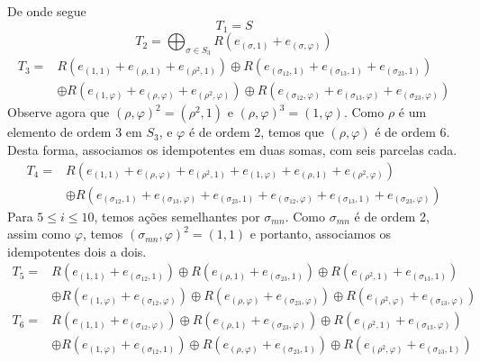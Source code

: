 \begin{exemplo}
De onde segue
\[T_1 = S\]
\[T_2 = \bigoplus_{\sigma \in S_3} R \left(e_{(\sigma, 1)} + e_{(\sigma,\varphi)}\right)\]
\begin{align*}
    T_3 =& R\left(e_{(1,1)} + e_{(\rho, 1)} + e_{(\rho^2, 1)} \right) \oplus R \left( e_{(\sigma_{12},1)} + e_{(\sigma_{13},1)} + e_{(\sigma_{23},1)} \right) \\
    &\oplus R\left(e_{(1,\varphi)} + e_{(\rho, \varphi)} + e_{(\rho^2, \varphi)} \right) \oplus R \left( e_{(\sigma_{12},\varphi)} + e_{(\sigma_{13},\varphi)} + e_{(\sigma_{23},\varphi)} \right)
\end{align*}
Observe agora que $(\rho, \varphi)^2 = (\rho^2, 1)$ e $(\rho, \varphi)^3 = (1, \varphi)$. Como $\rho$ é um elemento de ordem 3 em $S_3$, e $\varphi$ é de ordem 2, temos que $(\rho,\varphi)$ é de ordem 6. Desta forma, associamos os idempotentes em duas somas, com seis parcelas cada.
\begin{align*}
    T_4 = &R\left(e_{(1,1)} + e_{(\rho, \varphi)} + e_{(\rho^2, 1)} + e_{(1,\varphi)} + e_{(\rho, 1)} + e_{(\rho^2, \varphi)}\right) \\ 
    &\oplus R \left( e_{(\sigma_{12},1)} + e_{(\sigma_{13},\varphi)} + e_{(\sigma_{23},1)} + e_{(\sigma_{12},\varphi)} + e_{(\sigma_{13},1)} + e_{(\sigma_{23},\varphi)} \right)
\end{align*}
Para $5\leq i \leq 10$, temos ações semelhantes por $\sigma_{mn}$. Como $\sigma_{mn}$ é de ordem 2, assim como $\varphi$, temos $(\sigma_{mn}, \varphi)^2 = (1,1)$ e portanto, associamos os idempotentes dois a dois.
\begin{align*}
    T_5 =& R\left( e_{(1,1)} + e_{(\sigma_{12}, 1)} \right) \oplus R\left( e_{(\rho,1)} + e_{(\sigma_{23}, 1)} \right) \oplus R\left( e_{(\rho^2,1)} + e_{(\sigma_{13}, 1)} \right) \\
    &\oplus R\left( e_{(1,\varphi)} + e_{(\sigma_{12}, \varphi)} \right) \oplus R\left( e_{(\rho,\varphi)} + e_{(\sigma_{23}, \varphi)} \right) \oplus R\left( e_{(\rho^2,\varphi)} + e_{(\sigma_{13}, \varphi)} \right)
\end{align*}
\begin{align*}
    T_6 =& R\left( e_{(1,1)} + e_{(\sigma_{12}, \varphi)} \right) \oplus R\left( e_{(\rho,1)} + e_{(\sigma_{23}, \varphi)} \right) \oplus R\left( e_{(\rho^2,1)} + e_{(\sigma_{13}, \varphi)} \right) \\
    &\oplus R\left( e_{(1,\varphi)} + e_{(\sigma_{12}, 1)} \right) \oplus R\left( e_{(\rho,\varphi)} + e_{(\sigma_{23}, 1)} \right) \oplus R\left( e_{(\rho^2,\varphi)} + e_{(\sigma_{13}, 1)} \right)

\end{align*}
\end{exemplo}
